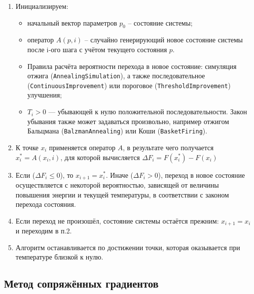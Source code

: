 \begin{enumerate}
	\item Инициализируем:
	\begin{itemize}
		\item начальный вектор параметров $p_0$ -- состояние системы;
		\item оператор $A(p, i)$ -- случайно генерирующий новое состояние системы после i-ого шага с учётом текущего состояния $p$. 
		\item Правила расчёта вероятности перехода в новое состояние: симуляция отжига (\texttt{AnnealingSimulation}), а также последовательное (\texttt{ContinuousImprovement}) или пороговое (\texttt{ThresholdImprovement}) улучшения;
		\item $T_i > 0$ — убывающей к нулю положительной последовательности. Закон убывания также может задаваться произвольно, например отжигом Бальцмана (\texttt{BalzmanAnnealing}) или Коши (\texttt{BasketFiring}).
	\end{itemize}
	\item К точке $x_{i}$ применяется оператор $A$, в результате чего получается $x_{i}^{*}=A(x_{i},i)$, для которой вычисляется $\Delta F_{i}=F({x_{i}^{*}})-F({x_{i}})$
	\item Если ($\Delta F_{i}\leq 0$), то $x_{i+1}={x_{i}^{*}}$. Иначе ($\Delta F_{i}>0$), переход в новое состояние осуществляется с некоторой вероятностью, зависящей от величины повышения энергии и текущей температуры, в соответствии с законом перехода состояния.
	\item Если переход не произошёл, состояние системы остаётся прежним: $x_{i+1}={x_{i}}$ и переходим в п.2. 
	\item Алгоритм останавливается по достижении точки, которая оказывается при температуре близкой к нулю.
\end{enumerate}

\subsection{Метод сопряжённых градиентов}

